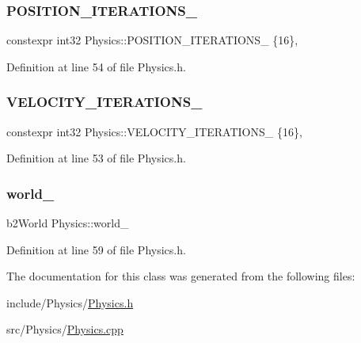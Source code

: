 \subsubsection{\texorpdfstring{P\+O\+S\+I\+T\+I\+O\+N\+\_\+\+I\+T\+E\+R\+A\+T\+I\+O\+N\+S\+\_\+}{POSITION\_ITERATIONS\_}}
{\footnotesize\ttfamily constexpr int32 Physics\+::\+P\+O\+S\+I\+T\+I\+O\+N\+\_\+\+I\+T\+E\+R\+A\+T\+I\+O\+N\+S\+\_\+ \{16\}\hspace{0.3cm}{\ttfamily [static]}, {\ttfamily [private]}}



Definition at line 54 of file Physics.\+h.

\mbox{\label{classPhysics_a8d5ed35d229b2ddd31656165b75d3c5a}} 
\subsubsection{\texorpdfstring{V\+E\+L\+O\+C\+I\+T\+Y\+\_\+\+I\+T\+E\+R\+A\+T\+I\+O\+N\+S\+\_\+}{VELOCITY\_ITERATIONS\_}}
{\footnotesize\ttfamily constexpr int32 Physics\+::\+V\+E\+L\+O\+C\+I\+T\+Y\+\_\+\+I\+T\+E\+R\+A\+T\+I\+O\+N\+S\+\_\+ \{16\}\hspace{0.3cm}{\ttfamily [static]}, {\ttfamily [private]}}



Definition at line 53 of file Physics.\+h.

\mbox{\label{classPhysics_a6f9efee327d116528efb9fd16b405bc6}} 
\subsubsection{\texorpdfstring{world\+\_\+}{world\_}}
{\footnotesize\ttfamily b2\+World Physics\+::world\+\_\+\hspace{0.3cm}{\ttfamily [private]}}



Definition at line 59 of file Physics.\+h.



The documentation for this class was generated from the following files\+:\begin{DoxyCompactItemize}
\item 
include/\+Physics/\hyperlink{Physics_8h}{Physics.\+h}\item 
src/\+Physics/\hyperlink{Physics_8cpp}{Physics.\+cpp}\end{DoxyCompactItemize}
